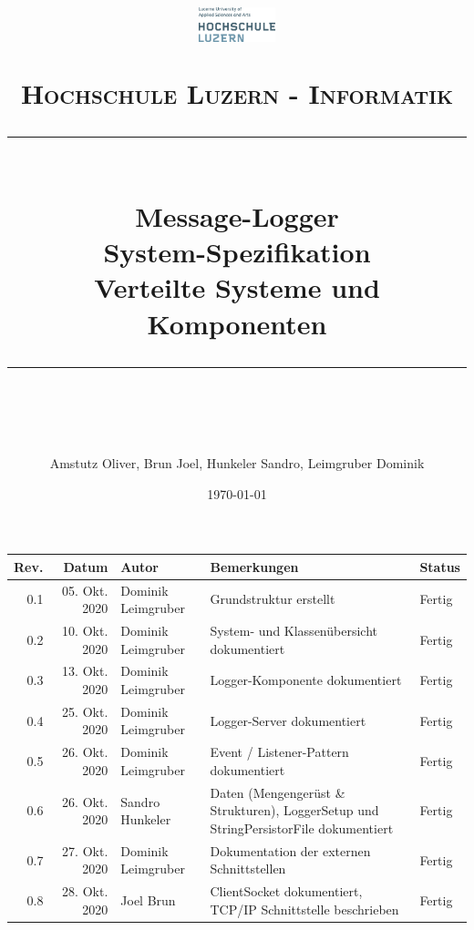 \documentclass[11pt]{scrartcl} %
\title{	
	\begin{figure}[h]
		\begin{flushright}
			\includegraphics[width=0.2\textwidth]{Bilder/hsluLogo.eps}			
		\end{flushright}
	\end{figure}
	\vspace{10pt} %
	\normalfont\normalsize
	\textsc{Hochschule Luzern - Informatik}
	\vspace{12pt} %
	\rule{\linewidth}{0.5pt}\\ %
	{\huge Message-Logger}\\
	{\huge System-Spezifikation}\\ %
	\vspace{10pt} %
	{\large Verteilte Systeme und Komponenten }
	\vspace{12pt} %
	\rule{\linewidth}{2pt}\\ %
	\vspace{12pt} %
}
\author{\Large Amstutz Oliver, Brun Joel, Hunkeler Sandro, Leimgruber Dominik} %
\date{\normalsize\today} %
\begin{document}
\maketitle %
\pagestyle{fancy}
\thispagestyle{empty}
\setcounter{page}{0}
\newpage
\begin{center}
	\begin{tabularx}{\textwidth}{|r|r|l|X|l|}
		\hline
		\textbf{Rev.} & \textbf{Datum} & \textbf{Autor} & \textbf{Bemerkungen} & \textbf{Status}  \\ 
		\hline
		0.1 & 05. Okt. 2020 & Dominik Leimgruber & Grundstruktur erstellt & Fertig \\
		\hline
		0.2 & 10. Okt. 2020 & Dominik Leimgruber & System- und Klassenübersicht dokumentiert & Fertig \\
		\hline
		0.3 & 13. Okt. 2020 & Dominik Leimgruber & Logger-Komponente dokumentiert & Fertig \\
		\hline
		0.4 & 25. Okt. 2020 & Dominik Leimgruber & Logger-Server dokumentiert & Fertig \\
		\hline
		0.5 & 26. Okt. 2020 & Dominik Leimgruber & Event / Listener-Pattern dokumentiert & Fertig \\
		\hline
		0.6 & 26. Okt. 2020 & Sandro Hunkeler & Daten (Mengengerüst \& Strukturen), LoggerSetup und StringPersistorFile dokumentiert & Fertig \\
		\hline
		0.7 & 27. Okt. 2020 & Dominik Leimgruber & Dokumentation der externen Schnittstellen & Fertig \\
		\hline
		0.8 & 28. Okt. 2020 & Joel Brun & ClientSocket dokumentiert, TCP/IP Schnittstelle beschrieben & Fertig \\
		\hline
	\end{tabularx}
\end{center}
\listoffigures
\listoftables
\newpage
\tableofcontents

\newpage








%


\end{document}
